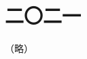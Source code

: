 \part{二〇二一}

\begin{center}
\Huge{}
\end{center}

\vspace*{2\ccwd}

\hspace{2em} （略）

\newpage


% 
% 
% 
% 
% 
% 